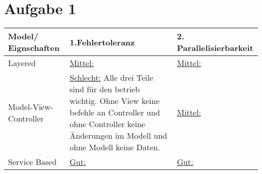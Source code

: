 \chapter*{Aufgabe 1}
\begin{center}
	\begin{tabular}	{|m{4cm}|m{6cm}|m{6cm}|}
		\hline
		Model/ Eignschaften & 1.Fehlertoleranz & 2. Parallelisierbarkeit  \\
		\hline 
		Layered & \underline{Mittel:} &  \underline{Mittel:} \\
		\hline 
		Model-View-Controller& \underline{Schlecht:}
		Alle drei Teile sind für den betrieb wichtig. Ohne View keine befehle an Controller und ohne Controller keine Änderungen im Modell und ohne Modell keine Daten.
		
				 & \underline{Mittel:}\\
		\hline 
		Service Based& 
		\underline{Gut:} & \underline{Gut:} \\
		\hline 
	\end{tabular}
\end{center}
